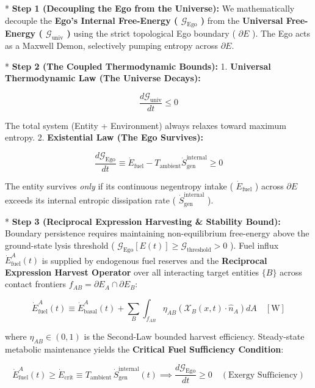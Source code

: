 \documentclass[11pt,a4paper]{article}
\theoremstyle{definition}
\theoremstyle{remark}
\begin{document}
* \textbf{Step 1 (Decoupling the Ego from the Universe):}
We mathematically decouple the \textbf{Ego's Internal Free-Energy ( $\mathcal{G}_{\text{Ego}}$ )} from the \textbf{Universal Free-Energy ( $\mathcal{G}_{\text{univ}}$ )} using the strict topological Ego boundary ( $\partial E$ ). The Ego acts as a Maxwell Demon, selectively pumping entropy across $\partial E$.

* \textbf{Step 2 (The Coupled Thermodynamic Bounds):}
1. \textbf{Universal Thermodynamic Law (The Universe Decays):}


\begin{equation}
\frac{d\mathcal{G}_{\text{univ}}}{dt} \le 0
\end{equation}


The total system (Entity + Environment) always relaxes toward maximum entropy.
2. \textbf{Existential Law (The Ego Survives):}


\begin{equation}
\frac{d\mathcal{G}_{\text{Ego}}}{dt} \equiv \dot{E}_{\text{fuel}} - T_{\text{ambient}} \dot{S}_{\text{gen}}^{\text{internal}} \ge 0
\end{equation}


The entity survives \textit{only} if its continuous negentropy intake ( $\dot{E}_{\text{fuel}}$ ) across $\partial E$ exceeds its internal entropic dissipation rate ( $\dot{S}_{\text{gen}}^{\text{internal}}$ ).

* \textbf{Step 3 (Reciprocal Expression Harvesting \& Stability Bound):}
Boundary persistence requires maintaining non-equilibrium free-energy above the ground-state lysis threshold ( $\mathcal{G}_{\text{Ego}}[E(t)] \ge \mathcal{G}_{\text{threshold}} > 0$ ). Fuel influx $\dot{E}_{\text{fuel}}^A(t)$ is supplied by endogenous fuel reserves and the \textbf{Reciprocal Expression Harvest Operator} over all interacting target entities $\{B\}$ across contact frontiers $f_{AB} = \partial E_A \cap \partial E_B$:


\begin{equation}
\boxed{\dot{E}_{\text{fuel}}^A(t) \equiv \dot{E}_{\text{basal}}^A(t) + \sum_{B} \int_{f_{AB}} \eta_{AB} \left( \boldsymbol{\mathcal{X}}_B(x, t) \cdot \hat{n}_A \right) dA \quad [\mathrm{W}]}
\end{equation}


where $\eta_{AB} \in (0, 1)$ is the Second-Law bounded harvest efficiency. Steady-state metabolic maintenance yields the \textbf{Critical Fuel Sufficiency Condition}:


\begin{equation}
\boxed{\dot{E}_{\text{fuel}}^A(t) \ge \dot{E}_{\text{crit}} \equiv T_{\text{ambient}} \, \dot{S}_{\text{gen}}^{\text{internal}}(t) \implies \frac{d\mathcal{G}_{\text{Ego}}}{dt} \ge 0 \quad (\text{Exergy Sufficiency})}
\end{equation}
\end{document}
